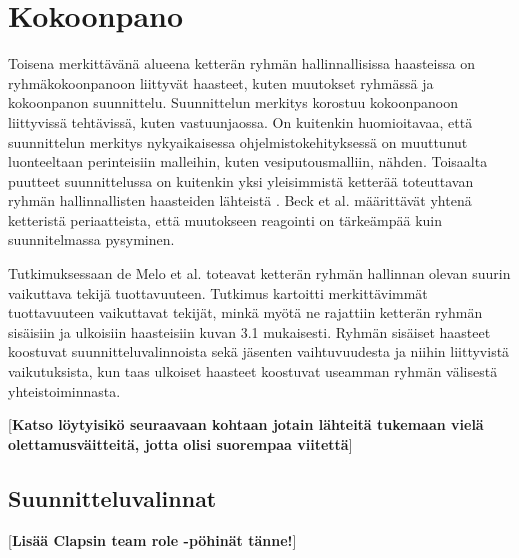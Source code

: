 \chapter{Kokoonpano}

Toisena merkittävänä alueena ketterän ryhmän hallinnallisissa haasteissa on ryhmäkokoonpanoon liittyvät haasteet, kuten muutokset ryhmässä ja kokoonpanon suunnittelu. Suunnittelun merkitys korostuu kokoonpanoon liittyvissä tehtävissä, kuten vastuunjaossa. On kuitenkin huomioitavaa, että suunnittelun merkitys nykyaikaisessa ohjelmistokehityksessä on muuttunut luonteeltaan perinteisiin malleihin, kuten vesiputousmalliin, nähden. Toisaalta puutteet suunnittelussa on kuitenkin yksi yleisimmistä ketterää toteuttavan ryhmän hallinnallisten haasteiden lähteistä \cite{7872736}. Beck et al. \cite{beck2001agile} määrittävät yhtenä ketteristä periaatteista, että muutokseen reagointi on tärkeämpää kuin suunnitelmassa pysyminen.

Tutkimuksessaan de Melo et al. \cite{DEOMELO2013412} toteavat ketterän ryhmän hallinnan olevan suurin vaikuttava tekijä tuottavuuteen. Tutkimus kartoitti merkittävimmät tuottavuuteen vaikuttavat tekijät, minkä myötä ne rajattiin ketterän ryhmän sisäisiin ja ulkoisiin haasteisiin kuvan 3.1 mukaisesti. Ryhmän sisäiset haasteet koostuvat suunnitteluvalinnoista sekä jäsenten vaihtuvuudesta ja niihin liittyvistä vaikutuksista, kun taas ulkoiset haasteet koostuvat useamman ryhmän välisestä yhteistoiminnasta.


[\textbf{Katso löytyisikö seuraavaan kohtaan jotain lähteitä tukemaan vielä olettamusväitteitä, jotta olisi suorempaa viitettä}]


\section{Suunnitteluvalinnat}

[\textbf{Lisää Clapsin team role -pöhinät tänne!}]

